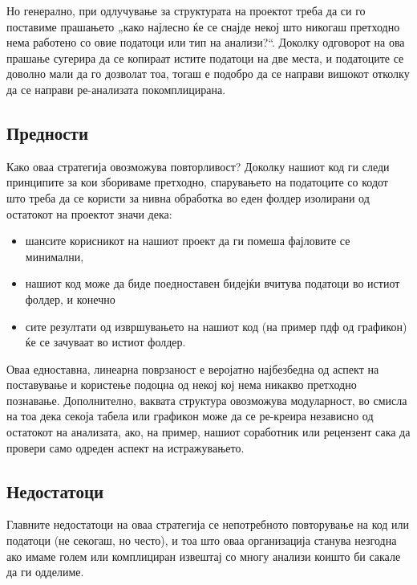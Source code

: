 \documentclass[
]{book}
\providecommand{\tightlist}{%
  \setlength{\itemsep}{0pt}\setlength{\parskip}{0pt}}
\begin{document}
Но генерално, при одлучување за структурата на проектот треба да си го поставиме прашањето „како најлесно ќе се снајде некој што никогаш претходно нема работено со овие податоци или тип на анализи?{}``. Доколку одговорот на ова прашање сугерира да се копираат истите податоци на две места, и податоците се доволно мали да го дозволат тоа, тогаш е подобро да се направи вишокот отколку да се направи ре-анализата покомплицирана.

\hypertarget{ux43fux440ux435ux434ux43dux43eux441ux442ux438}{%
\subsection{Предности}\label{ux43fux440ux435ux434ux43dux43eux441ux442ux438}}

Како оваа стратегија овозможува повторливост? Доколку нашиот код ги следи принципите за кои збориваме претходно, спарувањето на податоците со кодот што треба да се користи за нивна обработка во еден фолдер изолирани од остатокот на проектот значи дека:

\begin{itemize}
\tightlist
\item
  шансите корисникот на нашиот проект да ги помеша фајловите се минимални,\\
\item
  нашиот код може да биде поедноставен бидејќи вчитува податоци во истиот фолдер, и конечно
\item
  сите резултати од извршувањето на нашиот код (на пример пдф од графикон) ќе се зачуваат во истиот фолдер.
\end{itemize}

Оваа едноставна, линеарна поврзаност е веројатно најбезбедна од аспект на поставување и користење подоцна од некој кој нема никакво претходно познавање. Дополнително, ваквата структура овозможува модуларност, во смисла на тоа дека секоја табела или графикон може да се ре-креира независно од остатокот на анализата, ако, на пример, нашиот соработник или рецензент сака да провери само одреден аспект на истражувањето.

\hypertarget{ux43dux435ux434ux43eux441ux442ux430ux442ux43eux446ux438}{%
\subsection{Недостатоци}\label{ux43dux435ux434ux43eux441ux442ux430ux442ux43eux446ux438}}

Главните недостатоци на оваа стратегија се непотребното повторување на код или податоци (не секогаш, но често), и тоа што оваа организација станува незгодна ако имаме голем или комплициран извештај со многу анализи коишто би сакале да ги одделиме.
\end{document}
